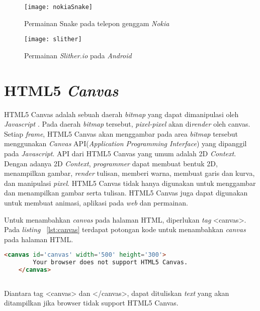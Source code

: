 \begin{figure}[H]
	\centering  
	\texttt{[image: nokiaSnake]}  
	\caption[Permainan Snake pada telepon genggam \textit{Nokia}]{Permainan Snake pada telepon genggam \textit{Nokia}} 
	\label{fig:nokiaSnake} 
\end{figure} 

\begin{figure}[H]
	\centering  
	\texttt{[image: slither]}  
	\caption[Permainan \textit{Slither.io} pada \textit{Android}]{Permainan \textit{Slither.io} pada \textit{Android}} 
	\label{fig:slither} 
\end{figure} 

\section{HTML5 \textit{Canvas}}
\label{sec:HTML5Canvas}
HTML5 Canvas adalah sebuah daerah \textit{bitmap} yang dapat dimanipulasi oleh \textit{Javascript} \cite{fulton2013html5}. Pada daerah \textit{bitmap} tersebut, \textit{pixel-pixel} akan di\textit{render} oleh canvas. Setiap \textit{frame}, HTML5 Canvas akan menggambar pada area \textit{bitmap} tersebut menggunakan \textit{Canvas} API(\textit{Application Programming Interface}) yang dipanggil pada \textit{Javascript}. API dari HTML5 Canvas yang umum adalah 2D \textit{Context}. Dengan adanya 2D \textit{Context}, \textit{programmer} dapat membuat bentuk 2D, menampilkan gambar, \textit{render} tulisan, memberi warna, membuat garis dan kurva, dan manipulasi \textit{pixel}. HTML5 Canvas tidak hanya digunakan untuk menggambar dan menampilkan gambar serta tulisan. HTML5 Canvas juga dapat digunakan untuk membuat animasi, aplikasi pada \textit{web} dan permainan. 

Untuk menambahkan \textit{canvas} pada halaman HTML, diperlukan \textit{tag} <canvas>. Pada \textit{listing} ~\ref{lst:canvas} terdapat potongan kode untuk menambahkan \textit{canvas} pada halaman HTML. 

\begin{lstlisting}[language=HTML, caption=Menambahkan \textit{canvas}, label={lst:canvas}]
	<canvas id='canvas' width='500' height='300'>
		Your browser does not support HTML5 Canvas.
	</canvas>
	
\end{lstlisting}

Diantara tag <canvas> dan </canvas>, dapat dituliskan \textit{text} yang akan ditampilkan jika browser tidak support HTML5 Canvas. 

